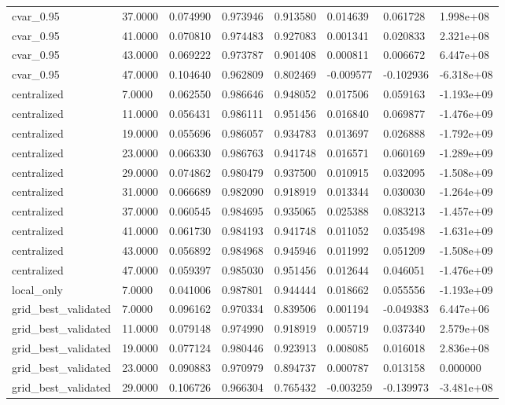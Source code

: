 \documentclass[11pt]{report}
\begin{document}
\begin{longtable}{llllllll}
cvar\_0.95 & 37.0000 & 0.074990 & 0.973946 & 0.913580 & 0.014639 & 0.061728 & 1.998e+08 \\
cvar\_0.95 & 41.0000 & 0.070810 & 0.974483 & 0.927083 & 0.001341 & 0.020833 & 2.321e+08 \\
cvar\_0.95 & 43.0000 & 0.069222 & 0.973787 & 0.901408 & 0.000811 & 0.006672 & 6.447e+08 \\
cvar\_0.95 & 47.0000 & 0.104640 & 0.962809 & 0.802469 & -0.009577 & -0.102936 & -6.318e+08 \\
centralized & 7.0000 & 0.062550 & 0.986646 & 0.948052 & 0.017506 & 0.059163 & -1.193e+09 \\
centralized & 11.0000 & 0.056431 & 0.986111 & 0.951456 & 0.016840 & 0.069877 & -1.476e+09 \\
centralized & 19.0000 & 0.055696 & 0.986057 & 0.934783 & 0.013697 & 0.026888 & -1.792e+09 \\
centralized & 23.0000 & 0.066330 & 0.986763 & 0.941748 & 0.016571 & 0.060169 & -1.289e+09 \\
centralized & 29.0000 & 0.074862 & 0.980479 & 0.937500 & 0.010915 & 0.032095 & -1.508e+09 \\
centralized & 31.0000 & 0.066689 & 0.982090 & 0.918919 & 0.013344 & 0.030030 & -1.264e+09 \\
centralized & 37.0000 & 0.060545 & 0.984695 & 0.935065 & 0.025388 & 0.083213 & -1.457e+09 \\
centralized & 41.0000 & 0.061730 & 0.984193 & 0.941748 & 0.011052 & 0.035498 & -1.631e+09 \\
centralized & 43.0000 & 0.056892 & 0.984968 & 0.945946 & 0.011992 & 0.051209 & -1.508e+09 \\
centralized & 47.0000 & 0.059397 & 0.985030 & 0.951456 & 0.012644 & 0.046051 & -1.476e+09 \\
local\_only & 7.0000 & 0.041006 & 0.987801 & 0.944444 & 0.018662 & 0.055556 & -1.193e+09 \\
grid\_best\_validated & 7.0000 & 0.096162 & 0.970334 & 0.839506 & 0.001194 & -0.049383 & 6.447e+06 \\
grid\_best\_validated & 11.0000 & 0.079148 & 0.974990 & 0.918919 & 0.005719 & 0.037340 & 2.579e+08 \\
grid\_best\_validated & 19.0000 & 0.077124 & 0.980446 & 0.923913 & 0.008085 & 0.016018 & 2.836e+08 \\
grid\_best\_validated & 23.0000 & 0.090883 & 0.970979 & 0.894737 & 0.000787 & 0.013158 & 0.000000 \\
grid\_best\_validated & 29.0000 & 0.106726 & 0.966304 & 0.765432 & -0.003259 & -0.139973 & -3.481e+08 \\

\end{longtable}
\end{document}
